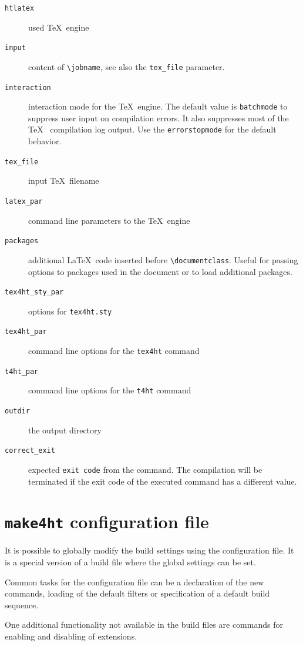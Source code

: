 \begin{description}
\item[\texttt{htlatex}]
used \TeX~engine
\item[\texttt{input}]
content of \texttt{\textbackslash{}jobname}, see also the
\texttt{tex\_file} parameter.
\item[\texttt{interaction}]
interaction mode for the \TeX~engine. The default value is
\texttt{batchmode} to suppress user input on compilation errors. It also
suppresses most of the \TeX~ compilation log output. Use the
\texttt{errorstopmode} for the default behavior.
\item[\texttt{tex\_file}]
input \TeX~filename
\item[\texttt{latex\_par}]
command line parameters to the \TeX~engine
\item[\texttt{packages}]
additional \LaTeX~code inserted before
\texttt{\textbackslash{}documentclass}. Useful for passing options to
packages used in the document or to load additional packages.
\item[\texttt{tex4ht\_sty\_par}]
options for \texttt{tex4ht.sty}
\item[\texttt{tex4ht\_par}]
command line options for the \texttt{tex4ht} command
\item[\texttt{t4ht\_par}]
command line options for the \texttt{t4ht} command
\item[\texttt{outdir}]
the output directory
\item[\texttt{correct\_exit}]
expected \texttt{exit\ code} from the command. The compilation will be
terminated if the exit code of the executed command has a different
value.
\end{description}

\section{\texorpdfstring{\texttt{make4ht} configuration
file}{make4ht configuration file}}\label{configfile}

It is possible to globally modify the build settings using the
configuration file. It is a special version of a build file where the
global settings can be set.

Common tasks for the configuration file can be a declaration of the new
commands, loading of the default filters or specification of a default
build sequence.

One additional functionality not available in the build files are
commands for enabling and disabling of extensions.

